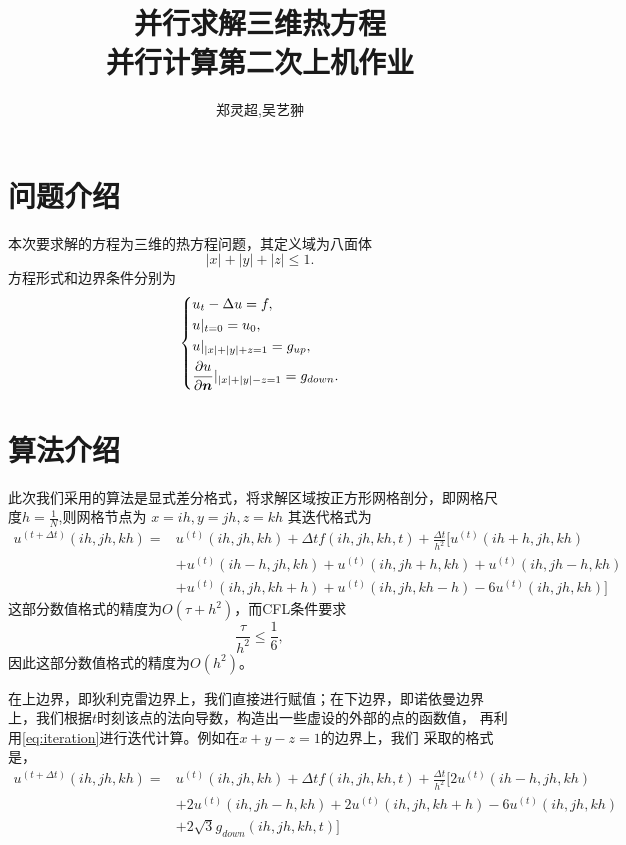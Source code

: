 \documentclass[a4paper,  11pt]{ctexart}
\newcommand\pd[2]{\dfrac{\partial {#1}}{\partial {#2}}}
\newcommand{\bm}[1]{\mbox{\boldmath{$#1$}}}
\begin{document}
\title{并行求解三维热方程 \\ 并行计算第二次上机作业}
\author{郑灵超,吴艺翀}
\maketitle
\tableofcontents
\newpage
\section{问题介绍}
本次要求解的方程为三维的热方程问题，其定义域为八面体
\[
 |x|+|y|+|z|\leq 1.
\]
方程形式和边界条件分别为
\begin{equation}
	\label{eq:Heatequation}
	\left\{
	\begin{aligned}
	&u_t-\Delta u = f,  \\
	&u|_{t=0} = u_0, \\
	&u|_{|x|+|y|+z=1} = g_{up}, \\
	&\pd{u}{\bm n}|_{|x|+|y|-z=1} = g_{down}. 
\end{aligned}
\right.
\end{equation}

\section{算法介绍}
此次我们采用的算法是显式差分格式，将求解区域按正方形网格剖分，即网格尺
度$h=\frac 1 N$,则网格节点为
$x=ih,y=jh,z=kh$
其迭代格式为
\begin{equation}
	\begin{aligned}
		\label{eq:iteration}
	u^{(t+\Delta t)}(ih,jh,kh) =& u^{(t)}(ih,jh,kh) +\Delta t
	f(ih,jh,kh,t) 
	 +\frac{\Delta t}{h^2}[
	u^{(t)}(ih+h,jh,kh)  \\  
	& +u^{(t)}(ih-h,jh,kh) 
 	+u^{(t)}(ih,jh+h,kh)+u^{(t)}(ih,jh-h,kh) \\ 
	& +u^{(t)}(ih,jh,kh+h)+u^{(t)}(ih,jh,kh-h) - 6 u^{(t)}(ih,jh,kh)
	]
\end{aligned}
\end{equation}
这部分数值格式的精度为$O(\tau+h^2)$，而CFL条件要求
$$\frac{\tau}{h^2}\leq \frac{1}{6},$$
因此这部分数值格式的精度为$O(h^2)$。

在上边界，即狄利克雷边界上，我们直接进行赋值；在下边界，即诺依曼边界
上，我们根据$t$时刻该点的法向导数，构造出一些虚设的外部的点的函数值，
再利用\eqref{eq:iteration}进行迭代计算。例如在$x+y-z=1$的边界上，我们
采取的格式是，
\begin{equation}
	\label{eq:neumann}
	\begin{aligned}
	u^{(t+\Delta t)}(ih,jh,kh) =& u^{(t)}(ih,jh,kh) +\Delta t
	f(ih,jh,kh,t) 
	 +\frac{\Delta t}{h^2}[
	  2u^{(t)}(ih-h,jh,kh) \\
 	&+ 2u^{(t)}(ih,jh-h,kh)+2u^{(t)}(ih,jh,kh+h)-6 u^{(t)}(ih,jh,kh)\\
	&+ 2\sqrt{3}g_{down}(ih,jh,kh,t)]
	\end{aligned}
\end{equation}
\end{document}
